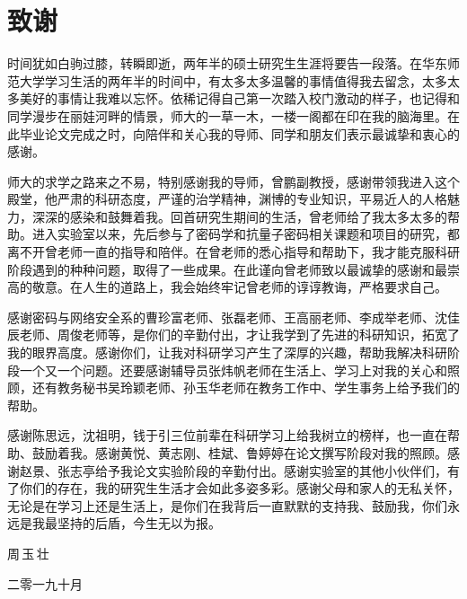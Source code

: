 {\kaishu
\chapter*{致\qquad 谢}
时间犹如白驹过膝，转瞬即逝，两年半的硕士研究生生涯将要告一段落。在华东师范大学学习生活的两年半的时间中，有太多太多温馨的事情值得我去留念，太多太多美好的事情让我难以忘怀。依稀记得自己第一次踏入校门激动的样子，也记得和同学漫步在丽娃河畔的情景，师大的一草一木，一楼一阁都在印在我的脑海里。在此毕业论文完成之时，向陪伴和关心我的导师、同学和朋友们表示最诚挚和衷心的感谢。

师大的求学之路来之不易，特别感谢我的导师，曾鹏副教授，感谢带领我进入这个殿堂，他严肃的科研态度，严谨的治学精神，渊博的专业知识，平易近人的人格魅力，深深的感染和鼓舞着我。回首研究生期间的生活，曾老师给了我太多太多的帮助。进入实验室以来，先后参与了密码学和抗量子密码相关课题和项目的研究，都离不开曾老师一直的指导和陪伴。在曾老师的悉心指导和帮助下，我才能克服科研阶段遇到的种种问题，取得了一些成果。在此谨向曾老师致以最诚挚的感谢和最崇高的敬意。在人生的道路上，我会始终牢记曾老师的谆谆教诲，严格要求自己。

感谢密码与网络安全系的曹珍富老师、张磊老师、王高丽老师、李成举老师、沈佳辰老师、周俊老师等，是你们的辛勤付出，才让我学到了先进的科研知识，拓宽了我的眼界高度。感谢你们，让我对科研学习产生了深厚的兴趣，帮助我解决科研阶段一个又一个问题。还要感谢辅导员张炜帆老师在生活上、学习上对我的关心和照顾，还有教务秘书吴玲颖老师、孙玉华老师在教务工作中、学生事务上给予我们的帮助。

感谢陈思远，沈祖明，钱于引三位前辈在科研学习上给我树立的榜样，也一直在帮助、鼓励着我。感谢黄悦、黄志刚、桂斌、鲁婷婷在论文撰写阶段对我的照顾。感谢赵景、张志亭给予我论文实验阶段的辛勤付出。感谢实验室的其他小伙伴们，有了你们的存在，我的研究生生活才会如此多姿多彩。感谢父母和家人的无私关怀，无论是在学习上还是生活上，是你们在我背后一直默默的支持我、鼓励我，你们永远是我最坚持的后盾，今生无以为报。


\vspace{0.8cm} \hspace{9.8cm}  周\,玉\,壮

\hspace{9cm}  二零一九十月 }
